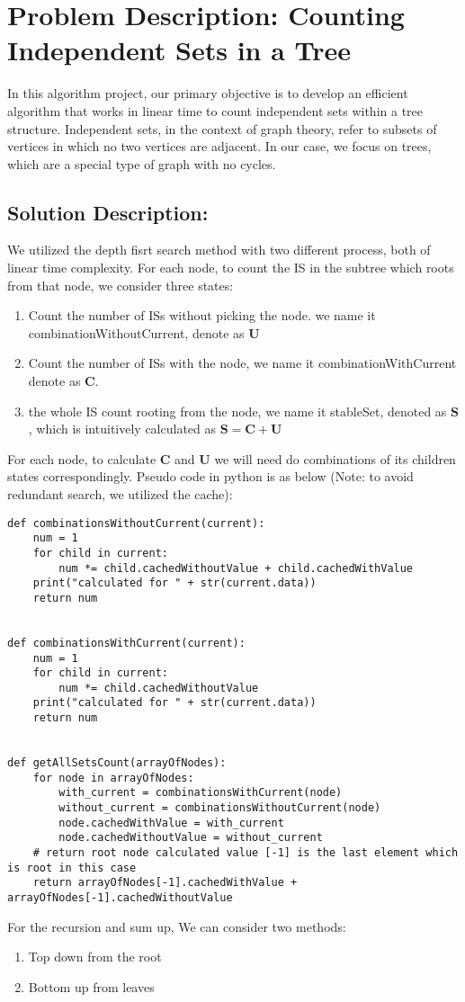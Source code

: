 \documentclass{article}
\begin{document}
\section*{Problem Description: Counting Independent Sets in a Tree}

In this algorithm project, our primary objective is to develop an efficient algorithm that works in linear time to count independent sets within a tree structure. Independent sets, in the context of graph theory, refer to subsets of vertices in which no two vertices are adjacent. In our case, we focus on trees, which are a special type of graph with no cycles.

\subsection*{Solution Description:}
We utilized the depth fisrt search method with two different process, both of linear time complexity. 
For each node, to count the IS in the subtree which roots from that node, we consider three states: 
\begin{enumerate}
  \item Count the number of ISs without picking the node. we name it combinationWithoutCurrent, denote as $\bm{U}$ \item Count the number of ISs with the node, we name it combinationWithCurrent denote as $\bm{C}$. \item the whole IS count rooting from the node, we name it stableSet, denoted as $\bm{S}$ , which is intuitively calculated as
$\bm{S} = \bm{C} + \bm{U}$ 
\end{enumerate}
For each node, to calculate $\bm{C}$ and $\bm{U}$ 
we will need do combinations of its children states correspondingly. Pseudo code in python is as below (Note: to avoid redundant search, we utilized the cache):
\begin{lstlisting}
def combinationsWithoutCurrent(current):
    num = 1
    for child in current:
        num *= child.cachedWithoutValue + child.cachedWithValue
    print("calculated for " + str(current.data))
    return num


def combinationsWithCurrent(current):
    num = 1
    for child in current:
        num *= child.cachedWithoutValue
    print("calculated for " + str(current.data))
    return num


def getAllSetsCount(arrayOfNodes):
    for node in arrayOfNodes:
        with_current = combinationsWithCurrent(node)
        without_current = combinationsWithoutCurrent(node)
        node.cachedWithValue = with_current
        node.cachedWithoutValue = without_current
    # return root node calculated value [-1] is the last element which is root in this case
    return arrayOfNodes[-1].cachedWithValue + arrayOfNodes[-1].cachedWithoutValue
\end{lstlisting}
For the recursion and sum up,
We can consider two methods: 
\begin{enumerate}
      \item Top down from the root \item Bottom up from leaves
\end{enumerate}
\end{document}
